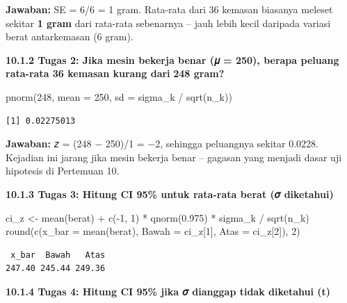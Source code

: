 \documentclass[
  indonesian,
  letterpaper,
]{book}
\newenvironment{Shaded}{\begin{snugshade}}{\end{snugshade}}
\newcommand{\AttributeTok}[1]{\textcolor[rgb]{0.40,0.45,0.13}{#1}}
\newcommand{\DecValTok}[1]{\textcolor[rgb]{0.68,0.00,0.00}{#1}}
\newcommand{\FloatTok}[1]{\textcolor[rgb]{0.68,0.00,0.00}{#1}}
\newcommand{\FunctionTok}[1]{\textcolor[rgb]{0.28,0.35,0.67}{#1}}
\newcommand{\NormalTok}[1]{\textcolor[rgb]{0.00,0.23,0.31}{#1}}
\newcommand{\OtherTok}[1]{\textcolor[rgb]{0.00,0.23,0.31}{#1}}
\newcommand{\SpecialCharTok}[1]{\textcolor[rgb]{0.37,0.37,0.37}{#1}}
\begin{document}
\textbf{Jawaban:} SE = 6/6 = 1 gram. Rata-rata dari 36 kemasan biasanya
meleset sekitar \textbf{1 gram} dari rata-rata sebenarnya -- jauh lebih
kecil daripada variasi berat antarkemasan (6 gram).

\textbf{10.1.2 Tugas 2: Jika mesin bekerja benar (𝜇 = 250), berapa
peluang rata-rata 36 kemasan kurang dari} \textbf{248 gram?}

\begin{Shaded}
\begin{Highlighting}[]
\FunctionTok{pnorm}\NormalTok{(}\DecValTok{248}\NormalTok{, }\AttributeTok{mean =} \DecValTok{250}\NormalTok{, }\AttributeTok{sd =}\NormalTok{ sigma\_k }\SpecialCharTok{/} \FunctionTok{sqrt}\NormalTok{(n\_k))}
\end{Highlighting}
\end{Shaded}

\begin{verbatim}
[1] 0.02275013
\end{verbatim}

\textbf{Jawaban:} 𝑧 = (248 − 250)/1 = −2, sehingga peluangnya sekitar
0.0228. Kejadian ini jarang jika mesin bekerja benar -- gagasan yang
menjadi dasar uji hipotesis di Pertemuan 10.

\textbf{10.1.3 Tugas 3: Hitung CI 95\% untuk rata-rata berat (𝜎
diketahui)}

\begin{Shaded}
\begin{Highlighting}[]
\NormalTok{ci\_z }\OtherTok{\textless{}{-}} \FunctionTok{mean}\NormalTok{(berat) }\SpecialCharTok{+} \FunctionTok{c}\NormalTok{(}\SpecialCharTok{{-}}\DecValTok{1}\NormalTok{, }\DecValTok{1}\NormalTok{) }\SpecialCharTok{*} \FunctionTok{qnorm}\NormalTok{(}\FloatTok{0.975}\NormalTok{) }\SpecialCharTok{*}\NormalTok{ sigma\_k }\SpecialCharTok{/} \FunctionTok{sqrt}\NormalTok{(n\_k)}
\FunctionTok{round}\NormalTok{(}\FunctionTok{c}\NormalTok{(}\AttributeTok{x\_bar =} \FunctionTok{mean}\NormalTok{(berat), }\AttributeTok{Bawah =}\NormalTok{ ci\_z[}\DecValTok{1}\NormalTok{], }\AttributeTok{Atas =}\NormalTok{ ci\_z[}\DecValTok{2}\NormalTok{]), }\DecValTok{2}\NormalTok{)}
\end{Highlighting}
\end{Shaded}

\begin{verbatim}
 x_bar  Bawah   Atas 
247.40 245.44 249.36 
\end{verbatim}

\textbf{10.1.4 Tugas 4: Hitung CI 95\% jika 𝜎 dianggap tidak diketahui
(t)}
\end{document}
